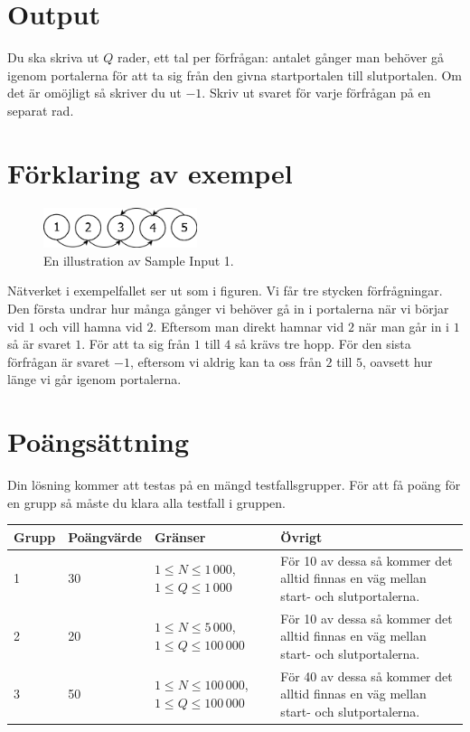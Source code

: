 \section*{Output}
Du ska skriva ut $Q$ rader, ett tal per förfrågan: antalet gånger man behöver gå
igenom portalerna för att ta sig från den givna startportalen till
slutportalen. Om det är omöjligt så skriver du ut $-1$. Skriv ut svaret
för varje förfrågan på en separat rad.

\section*{Förklaring av exempel}

\begin{figure}[ht!]
\centering
\includegraphics[width=0.4\textwidth]{portaler.png}
\caption{En illustration av Sample Input 1.}
\label{overflow}
\end{figure}

Nätverket i exempelfallet ser ut som i figuren. Vi får tre stycken förfrågningar. Den första
undrar hur många gånger vi behöver gå in i portalerna när vi börjar vid $1$ och vill hamna
vid $2$. Eftersom man direkt hamnar vid $2$ när man går in i $1$ så är svaret $1$. För att
ta sig från $1$ till $4$ så krävs tre hopp. För den sista förfrågan är svaret $-1$,
eftersom vi aldrig kan ta oss från $2$ till $5$, oavsett hur länge vi går igenom portalerna.

\section*{Poängsättning}
Din lösning kommer att testas på en mängd testfallsgrupper. För att få poäng för en grupp
så måste du klara alla testfall i gruppen.

\begin{tabular}{| l | l | l | l |}
\hline
Grupp & Poängvärde & Gränser & Övrigt\\ \hline
1     & 30         & $ 1 \le N \le 1\,000$,$1 \le Q \le 1\,000$ & För 10 av dessa så kommer det alltid finnas en väg mellan start- och slutportalerna. \\ \hline
2     & 20         & $ 1 \le N \le 5\,000$,$1 \le Q \le 100\,000$ & För 10 av dessa så kommer det alltid finnas en väg mellan start- och slutportalerna. \\ \hline
3     & 50         & $ 1 \le N \le 100\,000$,$1 \le Q \le 100\,000$ & För 40 av dessa så kommer det alltid finnas en väg mellan start- och slutportalerna. \\ \hline
\end{tabular}
